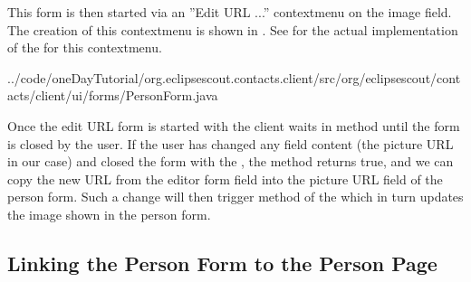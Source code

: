 \documentclass[a4paper,10pt,twoside]{book}
\begin{document}
This form is then started via an ''Edit URL ...'' contextmenu on the image field.
The creation of this contextmenu is shown in . 
See  for the actual implementation of the  for this contextmenu.


{../code/oneDayTutorial/org.eclipsescout.contacts.client/src/org/eclipsescout/contacts/client/ui/forms/PersonForm.java}

Once the edit URL form is started with  the client waits in method  until the form is closed by the user. 
If the user has changed any field content (the picture URL in our case) and closed the form with the , the method  returns true, and we can copy the new URL from the editor form field into the picture URL field of the person form. 
Such a change will then trigger method  of the  which in turn updates the image shown in the person form. 

\subsection{Linking the Person Form to the Person Page}
\end{document}
